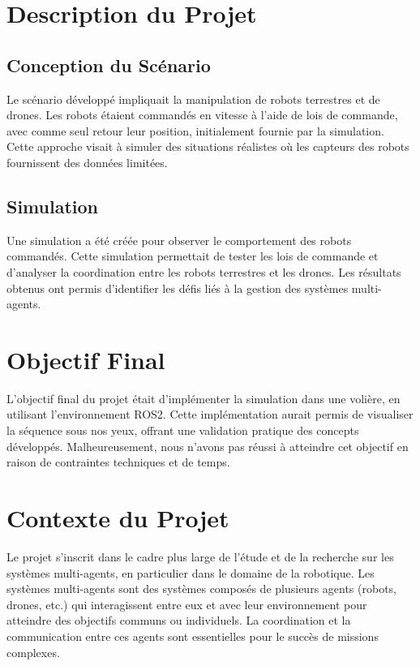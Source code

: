 \documentclass[a4paper,12pt]{article}
\begin{document}
\section*{Description du Projet}
\subsection*{Conception du Scénario}
Le scénario développé impliquait la manipulation de robots terrestres et de drones. Les robots étaient commandés en vitesse à l'aide de lois de commande, avec comme seul retour leur position, initialement fournie par la simulation. Cette approche visait à simuler des situations réalistes où les capteurs des robots fournissent des données limitées.

\subsection*{Simulation}
Une simulation a été créée pour observer le comportement des robots commandés. Cette simulation permettait de tester les lois de commande et d'analyser la coordination entre les robots terrestres et les drones. Les résultats obtenus ont permis d'identifier les défis liés à la gestion des systèmes multi-agents.

\section*{Objectif Final}
L'objectif final du projet était d'implémenter la simulation dans une volière, en utilisant l'environnement ROS2. Cette implémentation aurait permis de visualiser la séquence sous nos yeux, offrant une validation pratique des concepts développés. Malheureusement, nous n'avons pas réussi à atteindre cet objectif en raison de contraintes techniques et de temps.

\section*{Contexte du Projet}
Le projet s'inscrit dans le cadre plus large de l'étude et de la recherche sur les systèmes multi-agents, en particulier dans le domaine de la robotique. Les systèmes multi-agents sont des systèmes composés de plusieurs agents (robots, drones, etc.) qui interagissent entre eux et avec leur environnement pour atteindre des objectifs communs ou individuels. La coordination et la communication entre ces agents sont essentielles pour le succès de missions complexes.
\end{document}
